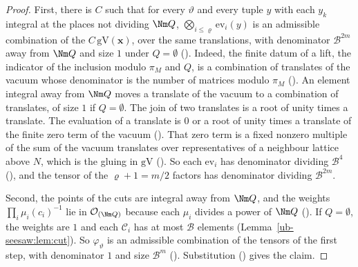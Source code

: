 \begin{proof}
First, there is $C$ such that for every $\vartheta$ and every tuple $y$ with each $y_k$ integral at
the places not dividing $\Nm Q$, $\bigotimes_{i\le\varrho}\mathrm{ev}_i(y)$ is an admissible
combination of the $C\,\mathrm{gV}(\mathbf x)$, over the same translations, with denominator
$\mathcal B^{2m}$ away from $\Nm Q$ and size $1$ under $Q=\emptyset$
(). Indeed, the finite datum of a lift,
the indicator of the inclusion modulo $\pi_M$ and $Q$, is a combination of translates of
the vacuum whose denominator is the number of matrices modulo $\pi_M$
(). An element integral away from
$\Nm Q$ moves a translate of the vacuum to a combination of translates, of size $1$ if
$Q=\emptyset$. The join of two translates is a root of unity times a translate. The
evaluation of a translate is $0$ or a root of unity times a translate of the finite zero term of the
vacuum (). That zero term is a
fixed nonzero multiple of the sum of the vacuum translates over representatives of a neighbour lattice
above $N$, which is the gluing in $\mathrm{gV}$
(). So each
$\mathrm{ev}_i$ has denominator dividing $\mathcal B^4$
(), and the tensor of the
$\varrho+1=m/2$ factors has denominator dividing $\mathcal B^{2m}$.

Second, the points of the cuts are integral away from $\Nm Q$, and the weights
$\prod_i\mu_i(c_i)^{-1}$ lie in $\mathcal O_{(\Nm Q)}$ because each $\mu_i$ divides a power of
$\Nm Q$ (). If $Q=\emptyset$, the weights are
$1$ and each $\mathcal C_i$ has at most $\mathcal B$ elements (Lemma~\ref{ub-seesaw:lem:cut}). So
$\varphi_\vartheta$ is an admissible combination of the tensors of the first step, with denominator
$1$ and size $\mathcal B^m$ (). Substitution
() gives the claim.
\end{proof}

